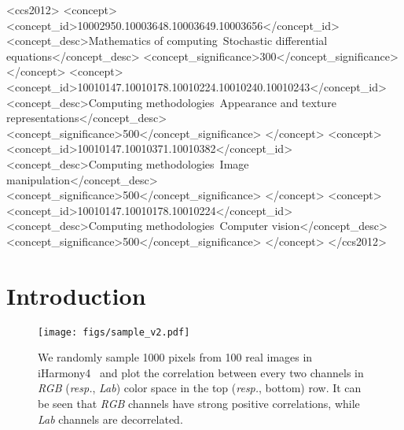 \documentclass[sigconf]{acmart}
\begin{document}
\begin{CCSXML}
<ccs2012>
    <concept>
        <concept_id>10002950.10003648.10003649.10003656</concept_id>
        <concept_desc>Mathematics of computing~Stochastic differential equations</concept_desc>
        <concept_significance>300</concept_significance>
    </concept>
    <concept>
        <concept_id>10010147.10010178.10010224.10010240.10010243</concept_id>
        <concept_desc>Computing methodologies~Appearance and texture representations</concept_desc>
        <concept_significance>500</concept_significance>
    </concept>
    <concept>
        <concept_id>10010147.10010371.10010382</concept_id>
        <concept_desc>Computing methodologies~Image manipulation</concept_desc>
        <concept_significance>500</concept_significance>
    </concept>
    <concept>
       <concept_id>10010147.10010178.10010224</concept_id>
       <concept_desc>Computing methodologies~Computer vision</concept_desc>
       <concept_significance>500</concept_significance>
    </concept>
</ccs2012>
\end{CCSXML}



\maketitle

\section{Introduction}\label{section:Introduction}

\begin{figure}[ht]
  \centering
  \texttt{[image: figs/sample\_v2.pdf]}
  \caption{
    We randomly sample 1000 pixels from 100 real images in iHarmony4~\cite{dovenet} and plot the correlation between every two channels in \textit{RGB} (\emph{resp.}, \textit{Lab}) color space in the top (\emph{resp.}, bottom) row. It can be seen that \textit{RGB} channels have strong positive correlations, while \textit{Lab} channels are decorrelated. 
  }
  \label{fig:example}
\end{figure}
\end{document}
